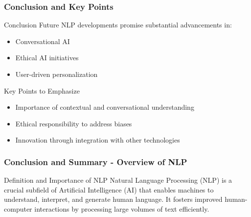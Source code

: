 \documentclass[aspectratio=169]{beamer}
\begin{document}
\begin{frame}[fragile]
    \frametitle{Conclusion and Key Points}
    \begin{block}{Conclusion}
        Future NLP developments promise substantial advancements in:
        \begin{itemize}
            \item Conversational AI
            \item Ethical AI initiatives
            \item User-driven personalization
        \end{itemize}
    \end{block}
    \begin{block}{Key Points to Emphasize}
        \begin{itemize}
            \item Importance of contextual and conversational understanding
            \item Ethical responsibility to address biases
            \item Innovation through integration with other technologies
        \end{itemize}
    \end{block}
\end{frame}

\begin{frame}[fragile]
    \frametitle{Conclusion and Summary - Overview of NLP}
    \begin{block}{Definition and Importance of NLP}
        Natural Language Processing (NLP) is a crucial subfield of Artificial Intelligence (AI) that enables machines to understand, interpret, and generate human language. It fosters improved human-computer interactions by processing large volumes of text efficiently.
    \end{block}
\end{frame}
\end{document}
